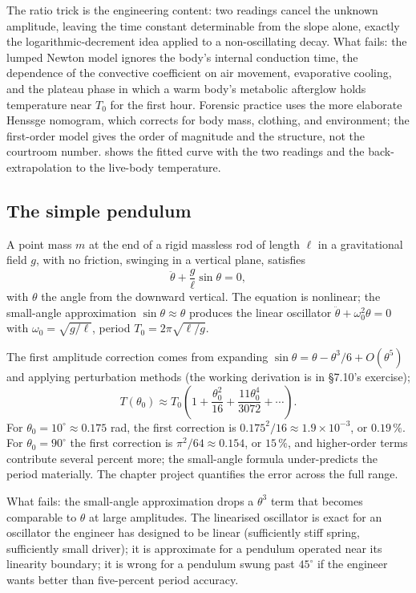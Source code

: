 The ratio trick is the engineering content: two readings cancel the
unknown amplitude, leaving the time constant determinable from the
slope alone, exactly the logarithmic-decrement idea applied to a
non-oscillating decay. What fails: the lumped Newton model ignores
the body's internal conduction time, the dependence of the
convective coefficient on air movement, evaporative cooling, and the
plateau phase in which a warm body's metabolic afterglow holds
temperature near $T_{0}$ for the first hour. Forensic practice uses
the more elaborate Henssge nomogram, which corrects for body mass,
clothing, and environment; the first-order model gives the order of
magnitude and the structure, not the courtroom number.
 shows the fitted curve with the
two readings and the back-extrapolation to the live-body temperature.



\subsection{The simple pendulum}

A point mass $m$ at the end of a rigid massless rod of length
$\ell$ in a gravitational field $g$, with no friction, swinging in
a vertical plane, satisfies
\[
\ddot{\theta} + \frac{g}{\ell} \sin\theta = 0,
\]
with $\theta$ the angle from the downward vertical. The equation
is nonlinear; the small-angle approximation $\sin\theta \approx
\theta$ produces the linear oscillator $\ddot{\theta} +
\omega_{0}^{2} \theta = 0$ with $\omega_{0} = \sqrt{g/\ell}$, period
$T_{0} = 2\pi\sqrt{\ell/g}$.

The first amplitude correction comes from expanding $\sin\theta =
\theta - \theta^{3}/6 + O(\theta^{5})$ and applying perturbation
methods (the working derivation is in §7.10's exercise);
\[
T(\theta_{0}) \approx T_{0}\!\left(1 + \frac{\theta_{0}^{2}}{16} + \frac{11 \theta_{0}^{4}}{3072} + \cdots\right).
\]
For $\theta_{0} = 10^{\circ} \approx 0.175$ rad, the first
correction is $0.175^{2}/16 \approx 1.9 \times 10^{-3}$, or
$0.19\,\%$. For $\theta_{0} = 90^{\circ}$ the first correction
is $\pi^{2}/64 \approx 0.154$, or $15\,\%$, and higher-order
terms contribute several percent more; the small-angle formula
under-predicts the period materially. The chapter project
quantifies the error across the full range.

What fails: the small-angle approximation drops a $\theta^{3}$
term that becomes comparable to $\theta$ at large amplitudes. The
linearised oscillator is exact for an oscillator the engineer has
designed to be linear (sufficiently stiff spring, sufficiently
small driver); it is approximate for a pendulum operated near its
linearity boundary; it is wrong for a pendulum swung past
$45^{\circ}$ if the engineer wants better than five-percent
period accuracy.

